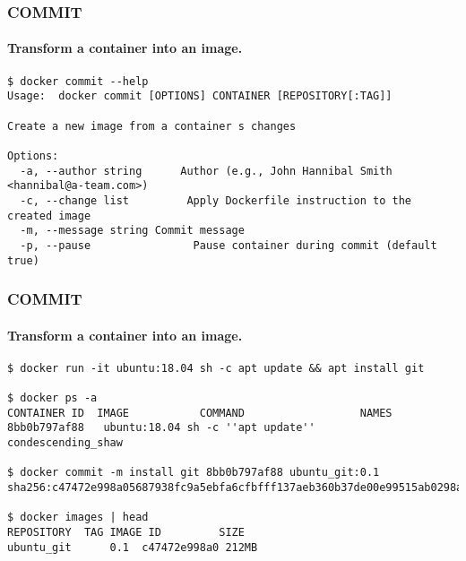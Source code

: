 \begin{frame}[fragile]
\frametitle{COMMIT}
\framesubtitle{Transform a container into an image.}
\scriptsize
\begin{lstlisting}[breaklines=true]
$ docker commit --help
Usage:  docker commit [OPTIONS] CONTAINER [REPOSITORY[:TAG]]

Create a new image from a container s changes

Options:
  -a, --author string      Author (e.g., John Hannibal Smith <hannibal@a-team.com>)
  -c, --change list         Apply Dockerfile instruction to the created image
  -m, --message string Commit message
  -p, --pause                Pause container during commit (default true)
\end{lstlisting}
\normalsize
\end{frame}

\begin{frame}[fragile]
\frametitle{COMMIT}
\framesubtitle{Transform a container into an image.}
\scriptsize
\begin{lstlisting}[breaklines=true]
$ docker run -it ubuntu:18.04 sh -c apt update && apt install git

$ docker ps -a
CONTAINER ID  IMAGE           COMMAND                  NAMES
8bb0b797af88   ubuntu:18.04 sh -c ''apt update''       condescending_shaw

$ docker commit -m install git 8bb0b797af88 ubuntu_git:0.1
sha256:c47472e998a05687938fc9a5ebfa6cfbfff137aeb360b37de00e99515ab0298a

$ docker images | head
REPOSITORY  TAG IMAGE ID         SIZE
ubuntu_git      0.1  c47472e998a0 212MB
\end{lstlisting}
\normalsize
\end{frame}